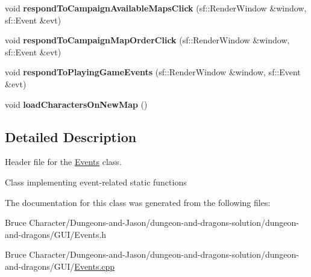 \begin{DoxyCompactItemize}
\item 
\hypertarget{class_events_a186517eecfac439e8e457f4f6a6f4aac}{}\label{class_events_a186517eecfac439e8e457f4f6a6f4aac} 
void {\bfseries respond\+To\+Campaign\+Available\+Maps\+Click} (sf\+::\+Render\+Window \&window, sf\+::\+Event \&evt)
\item 
\hypertarget{class_events_ac5a309db0b641111483e1f4200082659}{}\label{class_events_ac5a309db0b641111483e1f4200082659} 
void {\bfseries respond\+To\+Campaign\+Map\+Order\+Click} (sf\+::\+Render\+Window \&window, sf\+::\+Event \&evt)
\item 
\hypertarget{class_events_a592d8cbd278524fd52e80b5d7eaf22f7}{}\label{class_events_a592d8cbd278524fd52e80b5d7eaf22f7} 
void {\bfseries respond\+To\+Playing\+Game\+Events} (sf\+::\+Render\+Window \&window, sf\+::\+Event \&evt)
\item 
\hypertarget{class_events_a96bb6f4360ed7d45c1ea5c24ac3e1c33}{}\label{class_events_a96bb6f4360ed7d45c1ea5c24ac3e1c33} 
void {\bfseries load\+Characters\+On\+New\+Map} ()
\end{DoxyCompactItemize}


\subsection{Detailed Description}
Header file for the \hyperlink{class_events}{Events} class. 

Class implementing event-\/related static functions 

The documentation for this class was generated from the following files\+:\begin{DoxyCompactItemize}
\item 
Bruce Character/\+Dungeons-\/and-\/\+Jason/dungeon-\/and-\/dragons-\/solution/dungeon-\/and-\/dragons/\+G\+U\+I/Events.\+h\item 
Bruce Character/\+Dungeons-\/and-\/\+Jason/dungeon-\/and-\/dragons-\/solution/dungeon-\/and-\/dragons/\+G\+U\+I/\hyperlink{_events_8cpp}{Events.\+cpp}\end{DoxyCompactItemize}
